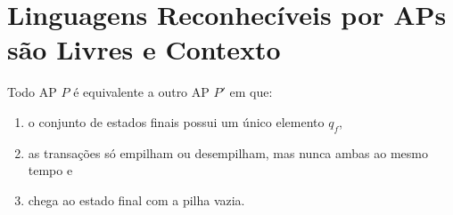 \begin{example}
  
\end{example}


\begin{example}
  
\end{example}


\section{Linguagens Reconhecíveis por APs são Livres e Contexto}
\label{sec:ap-llc}


\begin{lemma}
  Todo AP $P$ é equivalente a outro AP $P'$ em que:
\begin{enumerate}
\item o conjunto de estados finais possui um único elemento $q_f$,
\item as transações só empilham ou desempilham, mas nunca ambas ao mesmo tempo e
\item chega ao estado final com a pilha vazia.
\end{enumerate}
\end{lemma}

